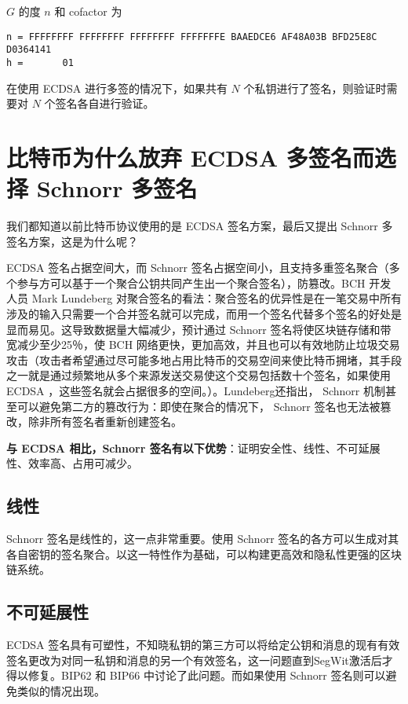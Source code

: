 \documentclass[a4paper,10pt]{article}
\begin{document}
\(G\) 的度 \(n\) 和 cofactor 为
\begin{lstlisting}
n = FFFFFFFF FFFFFFFF FFFFFFFF FFFFFFFE BAAEDCE6 AF48A03B BFD25E8C D0364141 
h =       01
\end{lstlisting}

在使用 ECDSA 进行多签的情况下，如果共有 \(N\) 个私钥进行了签名，则验证时需要对 \(N\) 个签名各自进行验证。

\section{比特币为什么放弃 ECDSA 多签名而选择 Schnorr 多签名}
我们都知道以前比特币协议使用的是 ECDSA 签名方案，最后又提出 Schnorr 多签名方案，这是为什么呢？

 ECDSA 签名占据空间大，而 Schnorr 签名占据空间小，且支持多重签名聚合（多个参与方可以基于一个聚合公钥共同产生出一个聚合签名），防篡改。BCH 开发人员 Mark Lundeberg 对聚合签名的看法：聚合签名的优异性是在一笔交易中所有涉及的输入只需要一个合并签名就可以完成，而用一个签名代替多个签名的好处是显而易见。这导致数据量大幅减少，预计通过 Schnorr 签名将使区块链存储和带宽减少至少25％，使 BCH 网络更快，更加高效，并且也可以有效地防止垃圾交易攻击（攻击者希望通过尽可能多地占用比特币的交易空间来使比特币拥堵，其手段之一就是通过频繁地从多个来源发送交易使这个交易包括数十个签名，如果使用 ECDSA ，这些签名就会占据很多的空间。）。Lundeberg还指出， Schnorr 机制甚至可以避免第二方的篡改行为：即使在聚合的情况下， Schnorr 签名也无法被篡改，除非所有签名者重新创建签名。

\textbf{与 ECDSA 相比，Schnorr 签名有以下优势}：证明安全性、线性、不可延展性、效率高、占用可减少。

\subsection{线性}

 Schnorr 签名是线性的，这一点非常重要。使用 Schnorr 签名的各方可以生成对其各自密钥的签名聚合。以这一特性作为基础，可以构建更高效和隐私性更强的区块链系统。

\subsection{不可延展性}

 ECDSA 签名具有可塑性，不知晓私钥的第三方可以将给定公钥和消息的现有有效签名更改为对同一私钥和消息的另一个有效签名，这一问题直到SegWit激活后才得以修复。BIP62 \cite{bip62} 和 BIP66 \cite{bip66}中讨论了此问题。而如果使用 Schnorr 签名则可以避免类似的情况出现。
\end{document}
